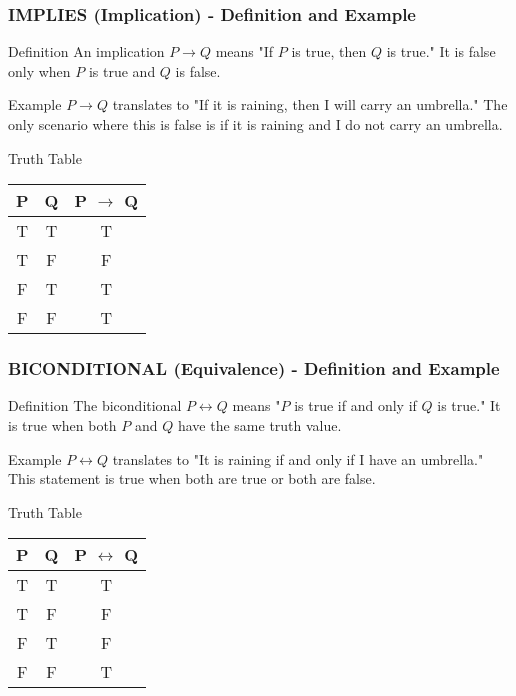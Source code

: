 \documentclass[aspectratio=169]{beamer}
\begin{document}
\begin{frame}[fragile]
    \frametitle{IMPLIES (Implication) - Definition and Example}
    \begin{block}{Definition}
        An implication \( P \rightarrow Q \) means "If \( P \) is true, then \( Q \) is true." It is false only when \( P \) is true and \( Q \) is false.
    \end{block}
    \begin{block}{Example}
        \( P \rightarrow Q \) translates to "If it is raining, then I will carry an umbrella." The only scenario where this is false is if it is raining and I do not carry an umbrella.
    \end{block}
    \begin{block}{Truth Table}
        \begin{tabular}{|c|c|c|}
            \hline
            P & Q & P $\rightarrow$ Q \\
            \hline
            T & T & T \\
            T & F & F \\
            F & T & T \\
            F & F & T \\
            \hline
        \end{tabular}
    \end{block}
\end{frame}

\begin{frame}[fragile]
    \frametitle{BICONDITIONAL (Equivalence) - Definition and Example}
    \begin{block}{Definition}
        The biconditional \( P \leftrightarrow Q \) means "\( P \) is true if and only if \( Q \) is true." It is true when both \( P \) and \( Q \) have the same truth value.
    \end{block}
    \begin{block}{Example}
        \( P \leftrightarrow Q \) translates to "It is raining if and only if I have an umbrella." This statement is true when both are true or both are false.
    \end{block}
    \begin{block}{Truth Table}
        \begin{tabular}{|c|c|c|}
            \hline
            P & Q & P $\leftrightarrow$ Q \\
            \hline
            T & T & T \\
            T & F & F \\
            F & T & F \\
            F & F & T \\
            \hline
        \end{tabular}
    \end{block}
\end{frame}
\end{document}
